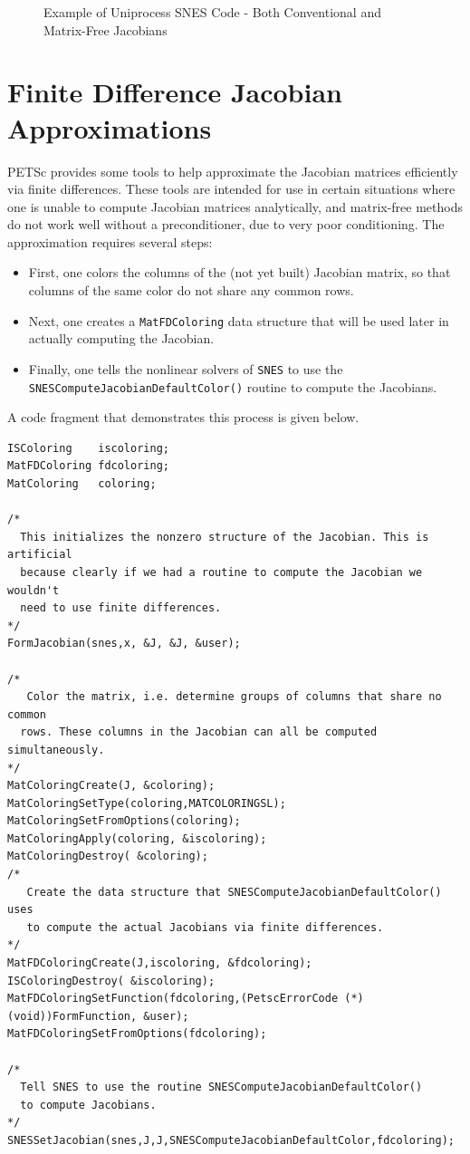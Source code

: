 \begin{figure}[H]

\caption{Example of Uniprocess SNES Code - Both Conventional and Matrix-Free Jacobians}
\label{fig_snesexample2}
\end{figure}

\section{Finite Difference Jacobian Approximations}
\label{sec_fdmatrix}

PETSc provides some tools to help approximate the Jacobian matrices efficiently via
finite differences.  These tools are intended for use in certain situations where
one is unable to compute Jacobian matrices analytically, and matrix-free methods
do not work well without a preconditioner, due to very poor conditioning.
The approximation requires several steps:
\begin{itemize}
\item First, one colors the columns of the (not yet built) Jacobian matrix, so that
      columns of the same color do not share any common rows.
\item Next, one creates a \lstinline{MatFDColoring} data structure that will be used later in
      actually computing the Jacobian.
\item Finally, one tells the nonlinear solvers of \lstinline{SNES} to use the
      \lstinline{SNESComputeJacobianDefaultColor()}
      routine to compute the Jacobians.
\end{itemize}
A code fragment that demonstrates this process is given below.
\begin{lstlisting}
ISColoring    iscoloring;
MatFDColoring fdcoloring;
MatColoring   coloring;

/*
  This initializes the nonzero structure of the Jacobian. This is artificial
  because clearly if we had a routine to compute the Jacobian we wouldn't
  need to use finite differences.
*/
FormJacobian(snes,x, &J, &J, &user);

/*
   Color the matrix, i.e. determine groups of columns that share no common 
  rows. These columns in the Jacobian can all be computed simultaneously.
*/
MatColoringCreate(J, &coloring);
MatColoringSetType(coloring,MATCOLORINGSL);
MatColoringSetFromOptions(coloring);
MatColoringApply(coloring, &iscoloring);
MatColoringDestroy( &coloring);
/*
   Create the data structure that SNESComputeJacobianDefaultColor() uses
   to compute the actual Jacobians via finite differences.
*/
MatFDColoringCreate(J,iscoloring, &fdcoloring);
ISColoringDestroy( &iscoloring);
MatFDColoringSetFunction(fdcoloring,(PetscErrorCode (*)(void))FormFunction, &user);
MatFDColoringSetFromOptions(fdcoloring);

/*
  Tell SNES to use the routine SNESComputeJacobianDefaultColor()
  to compute Jacobians.
*/
SNESSetJacobian(snes,J,J,SNESComputeJacobianDefaultColor,fdcoloring);

\end{lstlisting}


